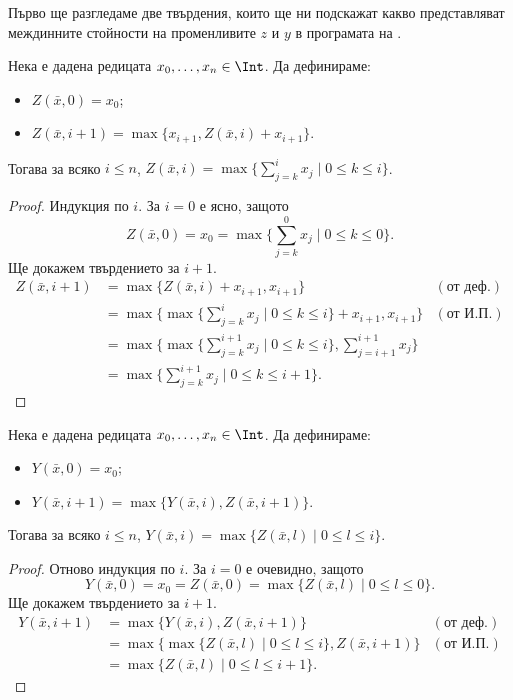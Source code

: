 Първо ще разгледаме две твърдения, които ще ни подскажат какво представляват междинните стойности на променливите $z$ и $y$ в програмата на .

\begin{prop}
  \label{pr:Z}
  Нека е дадена редицата $x_0,\dots,x_n \in \Int$.
  Да дефинираме:
  \begin{itemize}
  \item
    $Z(\bar{x},0) = x_0$;
  \item
    $Z(\bar{x},i+1) = \max\{x_{i+1}, Z(\bar{x},i)+x_{i+1}\}$.
  \end{itemize}
  Тогава за всяко $i \leq n$, $Z(\bar{x},i) = \max\{\sum^i_{j  = k}x_j \mid 0 \leq k \leq i\}$.
\end{prop}
\begin{proof}
  Индукция по $i$.
  За $i = 0$ е ясно, защото 
  \[Z(\bar{x},0) = x_0 = \max\{\sum^0_{j=k}x_j \mid 0\leq k\leq 0\}.\]
  Ще докажем твърдението за $i+1$.
  \begin{align*}
    Z(\bar{x},i+1) & = \max\{Z(\bar{x},i)+x_{i+1},x_{i+1}\} & (\text{от деф.})\\
    & = \max\{\max\{\sum^{i}_{j  = k}x_j \mid 0 \leq k \leq i\}+x_{i+1}, x_{i+1}\} & (\text{от И.П.})\\
    & = \max\{\max\{\sum^{i+1}_{j  = k}x_j \mid 0 \leq k \leq i\}, \sum^{i+1}_{j=i+1}x_j\}\\
    & = \max\{\sum^{i+1}_{j  = k}x_j \mid 0 \leq k \leq i+1\}.
  \end{align*}
\end{proof}

\begin{prop}
  \label{pr:Y}
  Нека е дадена редицата $x_0,\dots,x_n \in \Int$.
  Да дефинираме:
  \begin{itemize}
  \item 
    $Y(\bar{x},0) = x_0$;
  \item
    $Y(\bar{x},i+1) = \max\{Y(\bar{x},i), Z(\bar{x},i+1)\}$.
  \end{itemize}
  Тогава за всяко $i \leq n$, $Y(\bar{x},i) = \max\{Z(\bar{x},l) \mid 0 \leq l \leq i\}$.
\end{prop}
\begin{proof}
  Отново индукция по $i$.
  За $i = 0$ е очевидно, защото
  \[Y(\bar{x},0) = x_0 = Z(\bar{x},0) = \max\{Z(\bar{x},l) \mid 0 \leq l \leq 0\}.\]
  Ще докажем твърдението за $i+1$.
  \begin{align*}
    Y(\bar{x},i+1) & = \max\{Y(\bar{x},i), Z(\bar{x},i+1)\} & (\text{от деф.})\\
    & = \max\{\max\{Z(\bar{x},l) \mid 0 \leq l \leq i\}, Z(\bar{x},i+1)\} & (\text{от И.П.})\\
    & = \max\{Z(\bar{x},l) \mid 0 \leq l \leq i+1\}.
  \end{align*}
\end{proof}

